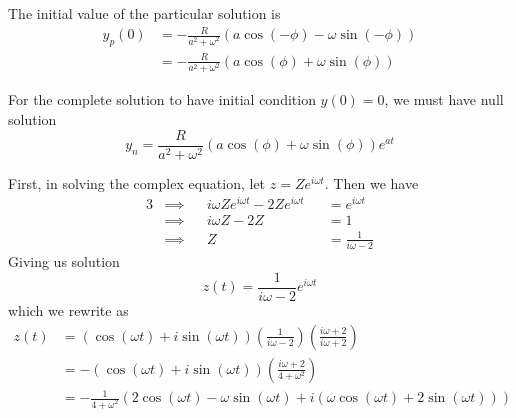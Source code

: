 \documentclass[a4paper]{article}
\begin{document}

The initial value of the particular solution is
\begin{align*}
	y_{p} \!\left( 0 \right) & = -\frac{R}{a^{2} + \omega^{2}} \!\left( a \cos\left( - \phi  \right) - \omega \sin\left( -\phi  \right) \right) \\
				 & = -\frac{R}{a^{2} + \omega^{2}} \!\left( a \cos\left( \phi  \right) + \omega \sin\left( \phi  \right) \right) 
\end{align*}

For the complete solution to have initial condition \(y \!\left( 0 \right) = 0\), we must have null solution
\[
	y_{n} = \frac{R}{a^{2} + \omega^{2}} \!\left( a \cos\left( \phi  \right) + \omega \sin\left( \phi  \right) \right) e^{at}
\]


First, in solving the complex equation, let \(z = Ze^{i \omega t}\). Then we have
\begin{alignat*}{3}
	&\implies && i \omega Ze^{i \omega t} - 2Ze^{i \omega t} && = e^{i \omega t} \\
	&\implies && i \omega Z - 2Z && = 1 \\ 
	& \implies && Z && = \frac{1}{i \omega - 2}
\end{alignat*}
Giving us solution
\[
	z \!\left( t \right) = \frac{1}{i \omega - 2} e^{i \omega t}
\]
which we rewrite as
\begin{align*}
	z \!\left( t \right)  & = \!\left( \cos\left( \omega t \right) + i \sin\left( \omega t \right) \right) \!\left( \frac{1}{i \omega - 2} \right) \!\left( \frac{i \omega + 2}{i \omega + 2} \right)  \\
	 & = - \!\left( \cos\left( \omega t \right) + i \sin\left( \omega t \right) \right) \!\left( \frac{i \omega + 2}{4 + \omega^{2}} \right)  \\
	 & = -\frac{1}{4 + \omega^{2}} \!\left( 2 \cos\left( \omega t \right) - \omega \sin\left( \omega t \right) + i \!\left( \omega \cos\left( \omega t \right) + 2 \sin\left( \omega t \right) \right)  \right) 
\end{align*}
\end{document}
